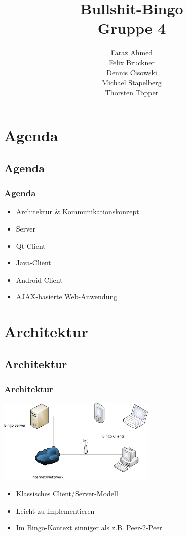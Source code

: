 \documentclass{beamer}
\title[]{Bullshit-Bingo\\ Gruppe 4}
\author{Faraz Ahmed\\
Felix Bruckner\\
Dennis Cisowski\\
Michael Stapelberg\\
Thorsten Töpper
}
\institute{Fakultät für Informatik\\
           Hochschule Mannheim}
\date{\datum}
\begin{document}
\begin{frame}
\titlepage
\end{frame}



\section{Agenda}

\subsection{Agenda}

\begin{frame}[fragile]
\frametitle{Agenda}
\begin{itemize}
\item Architektur \& Kommunikationskonzept
\item Server
\item Qt-Client
\item Java-Client
\item Android-Client
\item AJAX-basierte Web-Anwendung
\end{itemize}
\end{frame}

\section{Architektur}

\subsection{Architektur}
\begin{frame}[fragile]
\frametitle{Architektur}
\begin{center}
\includegraphics[height=4cm]{BingoClientServer.png}
\end{center}
\begin{itemize}
\item Klassisches Client/Server-Modell
\item Leicht zu implementieren
\item Im Bingo-Kontext sinniger als z.B. Peer-2-Peer
\end{itemize}
\end{frame}
\end{document}
